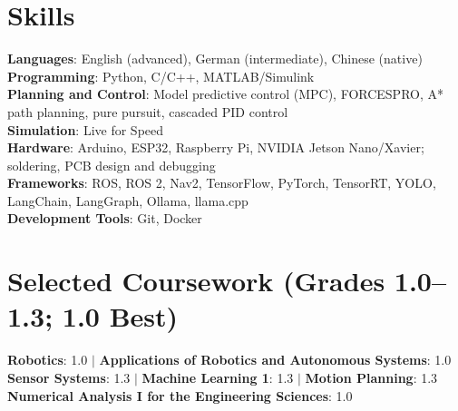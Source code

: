 \documentclass[letterpaper,11pt]{article}
\begin{document}
\section{Skills}
 \begin{itemize}[leftmargin=0.15in, label={}]
    \small{\item{
     \textbf{Languages}{: English (advanced), German (intermediate), Chinese (native)} \\
     \textbf{Programming}{: Python, C/C++, MATLAB/Simulink} \\
     \textbf{Planning and Control}{: Model predictive control (MPC), FORCESPRO, A* path planning, pure pursuit, cascaded PID control} \\
     \textbf{Simulation}{: Live for Speed} \\
     \textbf{Hardware}{: Arduino, ESP32, Raspberry Pi, NVIDIA Jetson Nano/Xavier; soldering, PCB design and debugging} \\
     \textbf{Frameworks}{: ROS, ROS 2, Nav2, TensorFlow, PyTorch, TensorRT, YOLO, LangChain, LangGraph, Ollama, llama.cpp}\\
     \textbf{Development Tools}{: Git, Docker}
    }}
 \end{itemize}

\section{Selected Coursework (Grades 1.0--1.3; 1.0 Best)}
 \begin{itemize}[leftmargin=0.15in, label={}]
    \small{\item{
     \textbf{Robotics}{: 1.0} $|$
     \textbf{Applications of Robotics and Autonomous Systems}{: 1.0} \\
     \textbf{Sensor Systems}{: 1.3} $|$
     \textbf{Machine Learning 1}{: 1.3} $|$
     \textbf{Motion Planning}{: 1.3} \\
     \textbf{Numerical Analysis I for the Engineering Sciences}{: 1.0}
    }}
 \end{itemize}

\end{document}
